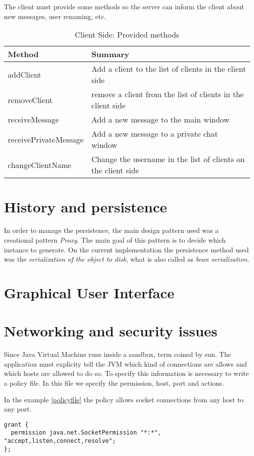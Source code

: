 \documentclass[8pt,a4paper]{article}
\begin{document}
The client must provide some methods so the server can inform the client about new messages, user renaming, etc.  
  \begin{table}[H]
  \begin{center}
      \begin{tabular}{ | l | p{5cm} |}
      \hline
      Method & Summary \\ \hline
      addClient & Add a client to the list of clients in the client side \\ \hline 
      removeClient & remove a client from the list of clients in the client side \\ \hline
      receiveMessage & Add a new message to the main window \\ \hline
      receivePrivateMessage &  Add a new message to a private chat window \\ \hline
      changeClientName & Change the username in the list of clients on the client side \\ \hline
      \end{tabular}
  \end{center}
  \caption{Client Side: Provided methods}
  \label{tab:clientprovide}
  \end{table}

\section{History and persistence}

In order to manage the persistence, the main design pattern used was a creational pattern {\it Proxy}. The main goal of this pattern is to decide which instance to generate.
On the current implementation the persistence method used was the {\it serialization of the object to disk}, what is also called as {\it bean serialization}. 

\section{Graphical User Interface}
\section{Networking and security issues}

Since Java Virtual Machine runs inside a sandbox, term coined by sun. The application must explicity tell the JVM which kind of connections are allows and which hosts are allowed to do so.
To specify this information is necessary to write a policy file. In this file we specify the permission, host, port and actions. 

In the example \ref{policyfile} the policy allows socket connections from any host to any port. 


\begin{lstlisting}[caption={Policy file},label=policyfile]
grant {
  permission java.net.SocketPermission "*:*", "accept,listen,connect,resolve";
};
\end{lstlisting}
\end{document}
